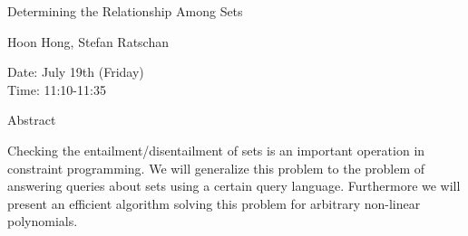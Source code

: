 \begin{center}
\LARGE
Determining the Relationship Among Sets

\end{center}

\begin{center}
\Large
Hoon Hong, Stefan Ratschan

\end{center}

\noindent
Date:  July 19th (Friday)\\
Time:  11:10-11:35\\

\begin{center}
\large
Abstract
\end{center}

Checking the entailment/disentailment of sets is an important operation in constraint
programming. We will generalize this problem to the problem of answering queries about sets
using a certain query language. Furthermore we will present an efficient algorithm solving this
problem for arbitrary non-linear polynomials. 

